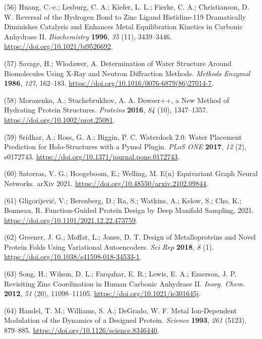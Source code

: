 \documentclass[  ASAPversion,
  ,
  9pt]{elife}
\newenvironment{cslreferences}%
  {}%
  {\par}
\begin{document}
\begin{cslreferences}
\leavevmode\hypertarget{ref-TNbPH3Y1}{}%
(56) Huang, C.-c.; Lesburg, C. A.; Kiefer, L. L.; Fierke, C. A.; Christianson, D. W. Reversal of the Hydrogen Bond to Zinc Ligand Histidine-119 Dramatically Diminishes Catalysis and Enhances Metal Equilibration Kinetics in Carbonic Anhydrase II. \emph{Biochemistry} \textbf{1996}, \emph{35} (11), 3439--3446. \url{https://doi.org/10.1021/bi9526692}.

\leavevmode\hypertarget{ref-NifwNdQd}{}%
(57) Savage, H.; Wlodawer, A. Determination of Water Structure Around Biomolecules Using X-Ray and Neutron Diffraction Methods. \emph{Methods Enzymol} \textbf{1986}, \emph{127}, 162--183. \url{https://doi.org/10.1016/0076-6879(86)27014-7}.

\leavevmode\hypertarget{ref-10C4imKQR}{}%
(58) Morozenko, A.; Stuchebrukhov, A. A. Dowser++, a New Method of Hydrating Protein Structures. \emph{Proteins} \textbf{2016}, \emph{84} (10), 1347--1357. \url{https://doi.org/10.1002/prot.25081}.

\leavevmode\hypertarget{ref-izkvZoLX}{}%
(59) Sridhar, A.; Ross, G. A.; Biggin, P. C. Waterdock 2.0: Water Placement Prediction for Holo-Structures with a Pymol Plugin. \emph{PLoS ONE} \textbf{2017}, \emph{12} (2), e0172743. \url{https://doi.org/10.1371/journal.pone.0172743}.

\leavevmode\hypertarget{ref-Fc42fl1x}{}%
(60) Satorras, V. G.; Hoogeboom, E.; Welling, M. E(n) Equivariant Graph Neural Networks. arXiv 2021. \url{https://doi.org/10.48550/arxiv.2102.09844}.

\leavevmode\hypertarget{ref-cbwvbkS6}{}%
(61) Gligorijević, V.; Berenberg, D.; Ra, S.; Watkins, A.; Kelow, S.; Cho, K.; Bonneau, R. Function-Guided Protein Design by Deep Manifold Sampling, 2021. \url{https://doi.org/10.1101/2021.12.22.473759}.

\leavevmode\hypertarget{ref-Gj0pG9O5}{}%
(62) Greener, J. G.; Moffat, L.; Jones, D. T. Design of Metalloproteins and Novel Protein Folds Using Variational Autoencoders. \emph{Sci Rep} \textbf{2018}, \emph{8} (1). \url{https://doi.org/10.1038/s41598-018-34533-1}.

\leavevmode\hypertarget{ref-TlDhIlX}{}%
(63) Song, H.; Wilson, D. L.; Farquhar, E. R.; Lewis, E. A.; Emerson, J. P. Revisiting Zinc Coordination in Human Carbonic Anhydrase II. \emph{Inorg. Chem.} \textbf{2012}, \emph{51} (20), 11098--11105. \url{https://doi.org/10.1021/ic301645j}.

\leavevmode\hypertarget{ref-RJ44nj3R}{}%
(64) Handel, T. M.; Williams, S. A.; DeGrado, W. F. Metal Ion-Dependent Modulation of the Dynamics of a Designed Protein. \emph{Science} \textbf{1993}, \emph{261} (5123), 879--885. \url{https://doi.org/10.1126/science.8346440}.


\end{cslreferences}
\end{document}
